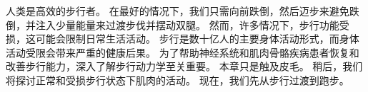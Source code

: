 人类是高效的步行者。
在最好的情况下，我们只需向前跌倒，然后迈步来避免跌倒，并注入少量能量来过渡步伐并摆动双腿。
然而，许多情况下，步行功能受损，这可能会限制日常生活活动。
步行是数十亿人的主要身体活动形式，而身体活动受限会带来严重的健康后果。
为了帮助神经系统和肌肉骨骼疾病患者恢复和改善步行能力，深入了解步行动力学至关重要。
本章只是触及皮毛。
稍后，我们将探讨正常和受损步行状态下肌肉的活动。
现在，我们先从步行过渡到跑步。














